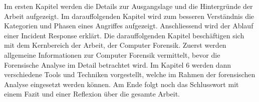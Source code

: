 Im ersten Kapitel werden die Details zur Ausgangslage und die Hintergründe der Arbeit aufgezeigt. Im darauffolgenden Kapitel wird zum besseren Verständnis die Kategorien und Phasen eines Angriffes aufgezeigt. Anschliessend wird der Ablauf einer Incident Response erklärt. Die darauffolgenden Kapitel beschäftigen sich mit dem Kernbereich der Arbeit, der Computer Forensik. Zuerst werden allgemeine Informationen zur Computer Forensik vermittelt, bevor die Forensische Analyse im Detail betrachtet wird. Im Kapitel 6 werden dann verschiedene Tools und Techniken vorgestellt, welche im Rahmen der forensischen Analyse eingesetzt werden können. Am Ende folgt noch das Schlusswort mit einem Fazit und einer Reflexion über die gesamte Arbeit.

